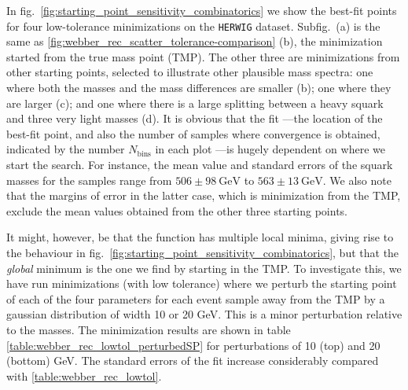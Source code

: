 \documentclass[twoside,english]{uiofysmaster}
\begin{document}
In fig.\ \ref{fig:starting_point_sensitivity_combinatorics} we show the best-fit points for four low-tolerance minimizations on the {\tt HERWIG} dataset. Subfig.\ (a) is the same as \ref{fig:webber_rec_scatter_tolerance-comparison} (b), the minimization started from the true mass point (TMP). The other three are minimizations from other starting points, selected to illustrate other plausible mass spectra: one where both the masses and the mass differences are smaller (b); one where they are larger (c); and one where there is a large splitting between a heavy squark and three very light masses (d). It is obvious that the fit ---the location of the best-fit point, and also the number of samples where convergence is obtained, indicated by the number $N_\mathrm{bins}$ in each plot ---is hugely dependent on where we start the search. For instance, the mean value and standard errors of the squark masses for the samples range from $506 \pm 98~\mathrm{GeV}$ to $563 \pm 13~\mathrm{GeV}$. We also note that the margins of error in the latter case, which is minimization from the TMP, exclude the mean values obtained from the other three starting points.



It might, however, be that the function has multiple local minima, giving rise to the behaviour in fig.\ \ref{fig:starting_point_sensitivity_combinatorics}, but that the {\it global} minimum is the one we find by starting in the TMP. To investigate this, we have run minimizations (with low tolerance) where we perturb the starting point of each of the four parameters for each event sample away from the TMP by a gaussian distribution of width 10 or 20 GeV. This is a minor perturbation relative to the masses. The minimization results are shown in table \ref{table:webber_rec_lowtol_perturbedSP} for perturbations of 10 (top) and 20 (bottom) GeV. The standard errors of the fit increase considerably compared with \ref{table:webber_rec_lowtol}. 
 
\end{document}
